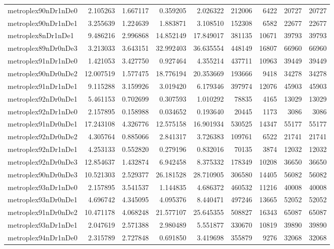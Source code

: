 \begin{longtable}{|l|r|r|r|r|r|r|r|r|}
metroplex90nDr1nDe0 & 2.105263 & 1.667117 & 0.359205 & 2.026322 & 212006 & 6422 & 20727 & 20727 \\
metroplex90nDr1nDe1 & 3.255639 & 1.224639 & 1.883871 & 3.108510 & 152308 & 6582 & 22677 & 22677 \\
metroplex8nDr1nDe1 & 9.486216 & 2.996868 & 14.852149 & 17.849017 & 381135 & 10671 & 39793 & 39793 \\
metroplex89nDr0nDe3 & 3.213033 & 3.643151 & 32.992403 & 36.635554 & 448149 & 16807 & 66960 & 66960 \\
metroplex91nDr1nDe0 & 1.421053 & 3.427750 & 0.927464 & 4.355214 & 437711 & 10963 & 39449 & 39449 \\
metroplex90nDr0nDe2 & 12.007519 & 1.577475 & 18.776194 & 20.353669 & 193666 & 9418 & 34278 & 34278 \\
metroplex91nDr1nDe1 & 9.115288 & 3.159926 & 3.019420 & 6.179346 & 397974 & 12076 & 45903 & 45903 \\
metroplex92nDr0nDe1 & 5.461153 & 0.702699 & 0.307593 & 1.010292 & 78835 & 4165 & 13029 & 13029 \\
metroplex92nDr1nDe0 & 2.157895 & 0.158988 & 0.034652 & 0.193640 & 20445 & 1173 & 3086 & 3086 \\
metroplex91nDr0nDe1 & 17.243108 & 4.326776 & 12.575158 & 16.901934 & 530525 & 14347 & 55177 & 55177 \\
metroplex92nDr0nDe2 & 4.305764 & 0.885066 & 2.841317 & 3.726383 & 109761 & 6522 & 21741 & 21741 \\
metroplex92nDr1nDe1 & 4.253133 & 0.552820 & 0.279196 & 0.832016 & 70135 & 3874 & 12032 & 12032 \\
metroplex92nDr0nDe3 & 12.854637 & 1.432874 & 6.942458 & 8.375332 & 178349 & 10208 & 36650 & 36650 \\
metroplex90nDr0nDe3 & 10.521303 & 2.529377 & 26.181528 & 28.710905 & 306580 & 14405 & 56082 & 56082 \\
metroplex93nDr1nDe0 & 2.157895 & 3.541537 & 1.144835 & 4.686372 & 460532 & 11216 & 40008 & 40008 \\
metroplex93nDr0nDe1 & 4.696742 & 4.345095 & 4.095376 & 8.440471 & 497246 & 13665 & 52052 & 52052 \\
metroplex91nDr0nDe2 & 10.471178 & 4.068248 & 21.577107 & 25.645355 & 508827 & 16343 & 65087 & 65087 \\
metroplex93nDr1nDe1 & 2.047619 & 2.571388 & 2.980489 & 5.551877 & 330670 & 10819 & 39890 & 39890 \\
metroplex94nDr1nDe0 & 2.315789 & 2.727848 & 0.691850 & 3.419698 & 355879 & 9276 & 32068 & 32068 \\

\end{longtable}
